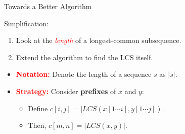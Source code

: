 \documentclass[aspectratio=169]{beamer}
\begin{document}
\begin{frame}{Towards a Better Algorithm}
    \begin{exampleblock}{Simplification:}
        \begin{enumerate}
            \item Look at the \textcolor{red}{\textit{length}} of a longest-common subsequence.
            \item Extend the algorithm to find the LCS itself.
        \end{enumerate}
    \end{exampleblock}
    \begin{itemize} \pause
        \item \textcolor{red}{\textbf{Notation:}} Denote the length of a sequence $s$ as $|s|$. \pause
        \item \textcolor{red}{\textbf{Strategy:}} Consider \textbf{prefixes} of $x$ and $y$:
            \begin{itemize}
                \item Define $c[i, j] = | LCS(x[1 \cdots i], y[1 \cdots j]) |$.
                \item Then, $c[m, n] = | LCS(x, y) |$.
            \end{itemize}
    \end{itemize}
\end{frame}
\end{document}
